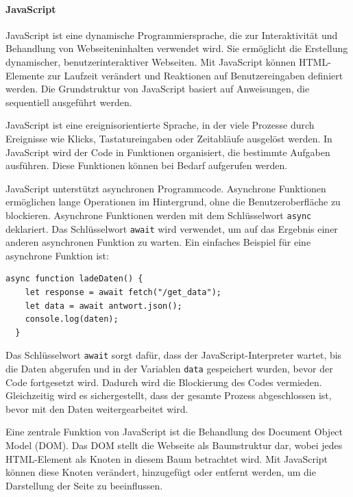 \documentclass[12pt, letterpaper]{article}
\begin{document}
  \paragraph{JavaScript}  
  \par \textbf{}
  \par JavaScript ist eine dynamische Programmiersprache, die zur Interaktivität und Behandlung von Webseiteninhalten verwendet wird. Sie ermöglicht die Erstellung dynamischer, benutzerinteraktiver Webseiten. Mit JavaScript können HTML-Elemente zur Laufzeit verändert und Reaktionen auf Benutzereingaben definiert werden.  Die Grundstruktur von JavaScript basiert auf Anweisungen, die sequentiell ausgeführt werden.
  \par JavaScript ist eine ereignisorientierte Sprache, in der viele Prozesse durch Ereignisse wie Klicks, Tastatureingaben oder Zeitabläufe ausgelöst werden. In JavaScript wird der Code in Funktionen organisiert, die bestimmte Aufgaben ausführen. Diese Funktionen können bei Bedarf aufgerufen werden. 
  \par JavaScript unterstützt asynchronen Programmcode. Asynchrone Funktionen ermöglichen lange Operationen im Hintergrund, ohne die Benutzeroberfläche zu blockieren. Asynchrone Funktionen werden mit dem Schlüsselwort \texttt{async} deklariert. Das Schlüsselwort \texttt{await} wird verwendet, um auf das Ergebnis einer anderen asynchronen Funktion zu warten. Ein einfaches Beispiel für eine asynchrone Funktion ist:
  \begin{lstlisting}[frame=single, style=htmlcssjs]
  async function ladeDaten() {
    let response = await fetch("/get_data");
    let data = await antwort.json();
    console.log(daten);
  }
  \end{lstlisting}
  \par Das Schlüsselwort \texttt{await} sorgt dafür, dass der JavaScript-Interpreter wartet, bis die Daten abgerufen und in der Variablen \texttt{data} gespeichert wurden, bevor der Code fortgesetzt wird. Dadurch wird die Blockierung des Codes vermieden. Gleichzeitig wird es sichergestellt, dass der gesamte Prozess abgeschlossen ist, bevor mit den Daten weitergearbeitet wird.   
  \par Eine zentrale Funktion von JavaScript ist die Behandlung des Document Object Model (DOM). Das DOM stellt die Webseite als Baumstruktur dar, wobei jedes HTML-Element als Knoten in diesem Baum betrachtet wird. Mit JavaScript können diese Knoten verändert, hinzugefügt oder entfernt werden, um die Darstellung der Seite zu beeinflussen.
\end{document}
